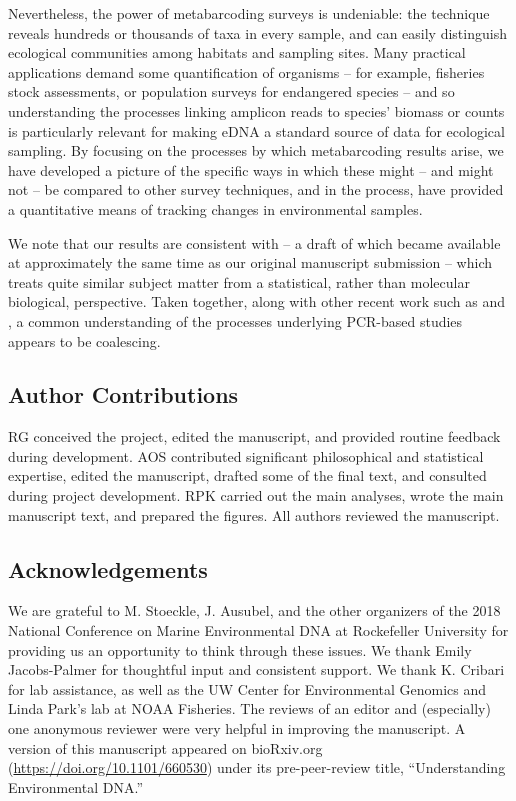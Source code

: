 \documentclass[fleqn,11pt,lineno]{wlscirep}
\begin{document}
Nevertheless, the power of metabarcoding surveys is undeniable: the technique reveals hundreds or thousands of taxa in every sample, and can easily distinguish ecological communities among habitats and sampling sites. Many practical applications demand some quantification of organisms -- for example, fisheries stock assessments, or population surveys for endangered species -- and so understanding the processes linking amplicon reads to species' biomass or counts is particularly relevant for making eDNA a standard source of data for ecological sampling. By focusing on the processes by which metabarcoding results arise, we have developed a picture of the specific ways in which these might -- and might not -- be compared to other survey techniques, and in the process, have provided a quantitative means of tracking changes in environmental samples.

We note that our results are consistent with \cite{mclaren2019consistent} -- a draft of which became available at approximately the same time as our original manuscript submission -- which treats quite similar subject matter from a statistical, rather than molecular biological, perspective. Taken together, along with other recent work such as \cite{pinol2019choice} and \cite{elbrecht2015can}, a common understanding of the processes underlying PCR-based studies appears to be coalescing.



\subsection{Author Contributions}\label{authorContributions}

RG conceived the project, edited the manuscript, and provided routine feedback during development. AOS contributed significant philosophical and statistical expertise, edited the manuscript, drafted some of the final text, and consulted during project development. RPK carried out the main analyses, wrote the main manuscript text, and prepared the figures. All authors reviewed the manuscript.

\subsection{Acknowledgements}\label{acknowledgements}

We are grateful to M. Stoeckle, J. Ausubel, and the other organizers of the 2018 National Conference on Marine Environmental DNA at Rockefeller University for providing us an opportunity to think through these issues. We thank Emily Jacobs-Palmer for thoughtful input and consistent support. We thank K. Cribari for lab assistance, as well as the UW Center for Environmental Genomics and Linda Park's lab at NOAA Fisheries. The reviews of an editor and (especially) one anonymous reviewer were very helpful in improving the manuscript. A version of this manuscript appeared on bioRxiv.org (\url{https://doi.org/10.1101/660530}) under its pre-peer-review title, ``Understanding Environmental DNA.''
\end{document}
